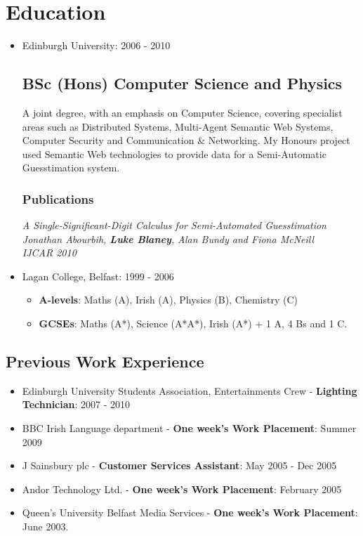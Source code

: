 \documentclass[a4paper]{article}
\begin{document}
\section*{Education}
\begin{itemize}

\item Edinburgh University: 2006 - 2010 \subsection*{BSc (Hons) Computer Science and Physics}
A joint degree, with an emphasis on Computer Science, covering specialist areas such as Distributed Systems, Multi-Agent Semantic Web Systems, Computer Security and Communication \& Networking.
My Honours project used Semantic Web technologies to provide data for a Semi-Automatic Guesstimation system.
\subsubsection*{Publications}
\em A Single-Significant-Digit Calculus for Semi-Automated Guesstimation \em\\
Jonathan Abourbih, {\bf Luke Blaney}, Alan Bundy and Fiona McNeill\\
IJCAR 2010

\item Lagan College, Belfast: 1999 - 2006
\begin{itemize}\item {\bf A-levels}: Maths (A), Irish (A), Physics (B), Chemistry (C)
\item {\bf GCSEs}: Maths (A*), Science (A*A*), Irish (A*) + 1 A, 4 Bs and 1 C.
\end{itemize}

\end{itemize}

\subsection*{Previous Work Experience}
\begin{itemize}

\item Edinburgh University Students Association, Entertainments Crew - {\bf Lighting Technician}: 2007 - 2010
\item BBC Irish Language department - {\bf One week's Work Placement}: Summer 2009
\item J Sainsbury plc - {\bf Customer Services Assistant}: May 2005 - Dec 2005
\item Andor Technology Ltd. - {\bf One week's Work Placement}:  February 2005
\item Queen's University Belfast Media Services - {\bf One week's Work Placement}:  June 2003.

\end{itemize}
\end{document}
